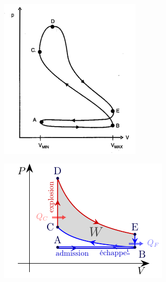 \documentclass[../../main/main.tex]{subfiles}
\begin{document}
\begin{isd}
\begin{center}
    \includegraphics[width=\linewidth]{cycle_bdr}
  \end{center}
  \begin{center}
    \includegraphics[width=\linewidth]{PV_otto}
  \end{center}
\end{isd}
\end{document}
